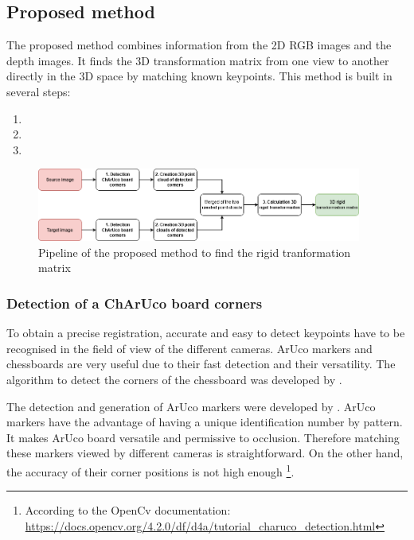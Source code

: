 \subsection{Proposed method}
\label{section:proposed_method}
The proposed method combines information from the 2D RGB images and  the depth images. It finds the 3D transformation matrix from one view to another directly in the 3D space by matching known keypoints. This method is built in several steps:

\begin{enumerate}
    \item {}
    \item {}
    \item {}
\end{enumerate}

\begin{figure}[H]
    \centering
    \includegraphics[width=0.95\textwidth]{images/registration/registration.png}
    \caption{Pipeline of the proposed method to find the rigid tranformation matrix}
    \label{figure:registration}
\end{figure}

\subsubsection{Detection of a ChArUco board corners}
\label{section:charuco_board_corners}
To obtain a precise registration, accurate and easy to detect keypoints have to be recognised in the field of view of the different cameras. ArUco markers and chessboards are very useful due to their fast detection and their versatility. The algorithm to detect the corners of the chessboard was developed by \cite{harris_combined_1988}.

The detection and generation of ArUco markers were developed by \cite{garrido-jurado_automatic_2014}. ArUco markers have the advantage of having a unique identification number by pattern. It makes ArUco board versatile and permissive to occlusion. Therefore matching these markers viewed by different cameras is straightforward. On the other hand, the accuracy of their corner positions is not high enough \footnote{According to the OpenCv documentation: \url{https://docs.opencv.org/4.2.0/df/d4a/tutorial_charuco_detection.html}}.

